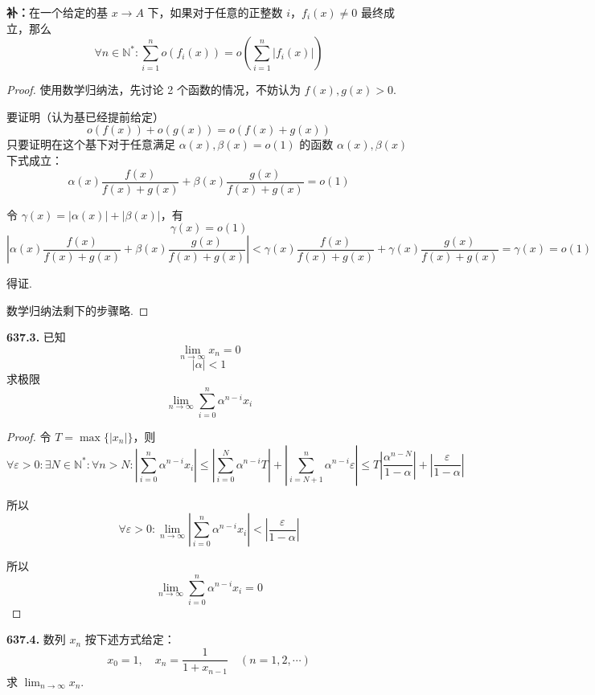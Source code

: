 \textbf{补：}在一个给定的基 $x \rightarrow A$ 下，如果对于任意的正整数 $i$，$f_i(x) \neq 0$ 最终成立，那么
\[\forall n \in \mathbb{N}^*: \sum_{i=1}^{n} o(f_i(x)) = o\left(\sum_{i=1}^{n} \lvert f_i(x)\rvert\right)\]
\begin{proof}
    使用数学归纳法，先讨论 2 个函数的情况，不妨认为 $f(x), g(x) > 0$.
    
    要证明（认为基已经提前给定）
    \[o(f(x)) + o(g(x)) = o(f(x) + g(x))\]
    只要证明在这个基下对于任意满足 $\alpha(x), \beta(x) = o(1)$ 的函数 $\alpha(x), \beta(x)$ 下式成立：
    \[\alpha(x) \frac{f(x)}{f(x) + g(x)} + \beta(x) \frac{g(x)}{f(x) + g(x)} = o(1)\]

    令 $\gamma(x) = \lvert\alpha(x)\rvert + \lvert\beta(x)\rvert$，有
    \[\gamma(x) = o(1)\]
    \[\left|\alpha(x) \frac{f(x)}{f(x) + g(x)} + \beta(x) \frac{g(x)}{f(x) + g(x)}\right| < \gamma(x) \frac{f(x)}{f(x) + g(x)} + \gamma(x) \frac{g(x)}{f(x) + g(x)} = \gamma(x) = o(1)\]
    
    得证.

    数学归纳法剩下的步骤略.
\end{proof}\vspace{9pt}

\textbf{637.3.} 已知
\[\lim_{n \rightarrow \infty} x_n = 0\]
\[\lvert \alpha\rvert < 1\]
求极限
\[\lim_{n \rightarrow \infty} \sum_{i=0}^{n} \alpha^{n-i} x_i\]

\begin{proof}
    令 $T = \max\{\lvert x_n\rvert\}$，则
    \[\forall \varepsilon > 0: \exists N \in \mathbb{N}^*: \forall n > N: \left| \sum_{i=0}^{n} \alpha^{n-i} x_i\right| \leqslant \left| \sum_{i=0}^{N} \alpha^{n-i}T\right| + \left| \sum_{i=N+1}^{n} \alpha^{n-i} \varepsilon \right| \leqslant T \left|\frac{\alpha^{n-N}}{1 - \alpha}\right| + \left|\frac{\varepsilon}{1 - \alpha}\right|\]

    所以
    \[\forall \varepsilon > 0: \lim_{n \rightarrow \infty} \left| \sum_{i=0}^{n} \alpha^{n-i} x_i\right| < \left| \frac{\varepsilon}{1 - \alpha}\right|\]

    所以
    \[\lim_{n \rightarrow \infty} \sum_{i=0}^{n} \alpha^{n-i} x_i = 0\]
\end{proof}\vspace{9pt}

\textbf{637.4.} 数列 $x_n$ 按下述方式给定：
\[x_0 = 1, \quad x_n = \frac{1}{1 + x_{n-1}} \quad (n = 1,2,\cdots)\]
求 $\displaystyle \lim_{n \rightarrow \infty} x_n$.

